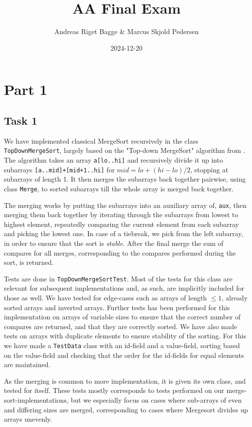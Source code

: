 \documentclass[11pt, a4paper]{article}
\title{AA Final Exam}
\author{Andreas Riget Bagge \& Marcus Skjold Pedersen}
\date{2024-12-20}
\begin{document}
\maketitle

\section{Part 1}

\subsection{Task 1}
We have implemented classical MergeSort recursively in the class \verb|TopDownMergeSort|, largely based on the "Top-down MergeSort" algorithm from \cite{Sedgewick_Wayne_2011}. The algorithm takes an array \verb|a[lo..hi]| and recursively divide it up into subarrays \verb|[a..mid]+[mid+1..hi]| for $mid=lo+(hi-lo)/2$, stopping at subarrays of length 1. It then merges the subarrays back together pairwise, using class \verb|Merge|, to sorted subarrays till the whole array is merged back together.

The merging works by putting the subarrays into an auxiliary array of, \verb|aux|, then merging them back together by iterating through the subarrays from lowest to highest element, repeatedly comparing the current element from each subarray and picking the lowest one. In case of a tiebreak, we pick from the left subarray, in order to ensure that the sort is \textit{stable}. After the final merge the sum of compares for all merges, corresponding to the compares performed during the sort, is returned.

Tests are done in \verb|TopDownMergeSortTest|. Most of the tests for this class are relevant for subsequent implementations and, as such, are implicitly included for those as well. We have tested for edge-cases such as arrays of length $\leq 1$, already sorted arrays and inverted arrays. Further tests has been performed for this implementation on arrays of variable sizes to ensure that the correct number of compares are returned, and that they are correctly sorted. We have also made tests on arrays with duplicate elements to ensure stability of the sorting. For this we have made a \verb|TestData| class with an id-field and a value-field, sorting based on the value-field and checking that the order for the id-fields for equal elements are maintained.

As the merging is common to more implementation, it is given its own class, and tested for itself. These tests mostly corresponds to tests performed on our merge-sort-implementations, but we especially focus on cases where sub-arrays of even and differing sizes are merged, corresponding to cases where Mergesort divides up arrays unevenly.
\end{document}
